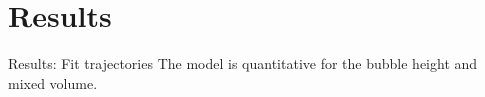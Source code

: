 \documentclass[12pt]{beamer}
\begin{document}
\section{Results}
\begin{frame}[t]{Results: Fit trajectories}
The model is quantitative for the bubble height and mixed volume.
\begin{center}

\end{center}
\end{frame}
\end{document}
